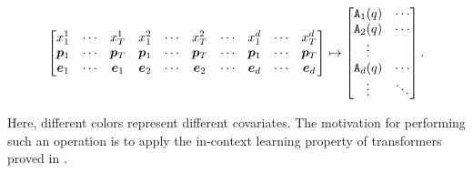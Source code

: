 \begin{equation*}
\begin{bmatrix}
    x_1^1 & \cdots & x_T^1 & x_1^2 & \cdots & x_T^2 & \cdots & x_1^d & \cdots & x_T^d
    \\
    \bm{p}_1 & \cdots & \bm{p}_T & \bm{p}_1 & \cdots & \bm{p}_T & \cdots & \bm{p}_1 & \cdots & \bm{p}_T
    \\
    \bm{e}_1 & \cdots & \bm{e}_1 & \bm{e}_2 & \cdots & \bm{e}_2 & \cdots & \bm{e}_d & \cdots & \bm{e}_d
\end{bmatrix}
\mapsto
\begin{bmatrix}
    \mathtt{A}_1(q) & \cdots
    \\
    \mathtt{A}_2(q) & \cdots
    \\
    \vdots
    \\
    \mathtt{A}_d(q) & \cdots
    \\
    \vdots & \ddots
\end{bmatrix}.
\end{equation*}

Here, different colors represent different covariates.
The motivation for performing such an operation is to apply the in-context learning property of transformers proved in \cite{bai2024transformers}.


